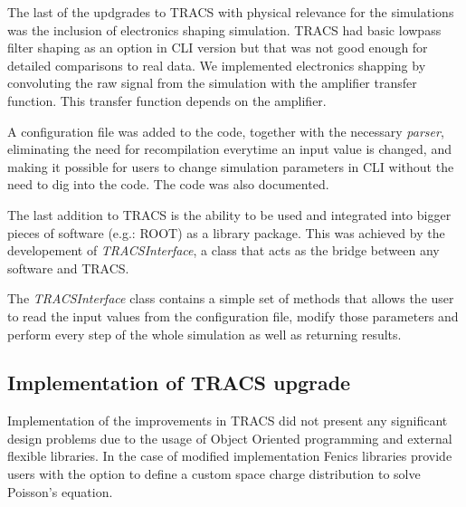 The last of the updgrades to TRACS with physical relevance for the simulations was the inclusion of electronics shaping simulation. TRACS had basic lowpass filter shaping as an option in CLI version but that was not good enough for detailed comparisons to real data. We implemented electronics shapping by convoluting the raw signal from the simulation with the amplifier transfer function. This transfer function depends  on the amplifier.



A configuration file was added to the code, together with the necessary \textit{parser}, eliminating the need for recompilation everytime an input value is changed, and making it possible for users to change simulation parameters in CLI without the need to dig into the code. The code was also documented.

The last addition to TRACS is the ability to be used and integrated into bigger pieces of software (e.g.: ROOT) as a library package. This was achieved by the developement of \textit{TRACSInterface}, a class that acts as the bridge between any software and TRACS.

The \textit{TRACSInterface} class contains a simple set of methods that allows the user to read the input values from the configuration file, modify those parameters and perform every step of the whole simulation as well as returning results.

\subsection{Implementation of TRACS upgrade}

Implementation of the improvements in TRACS did not present any significant design problems due to the usage of Object Oriented programming and external flexible libraries. In the case of modified \neff implementation Fenics libraries provide users with the option to define a custom space charge distribution to solve Poisson's equation. 

